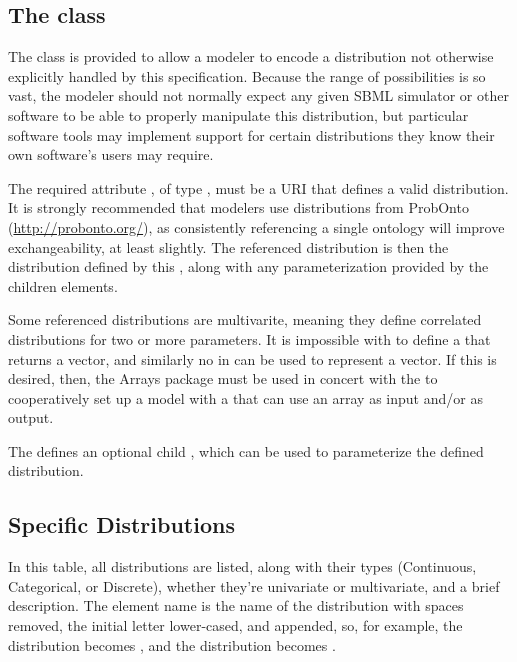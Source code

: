 \subsection{The  class}
\label{ExternalDistribution-class}
\label{externaldistribution-class}

The \ExternalDistribution class is provided to allow a modeler to encode a distribution not otherwise explicitly handled by this specification.  Because the range of possibilities is so vast, the modeler should not normally expect any given SBML simulator or other software to be able to properly manipulate this distribution, but particular software tools may implement support for certain distributions they know their own software's users may require.

The required attribute , of type , must be a URI that defines a valid distribution.  It is strongly recommended that modelers use distributions from ProbOnto (\url{http://probonto.org/}), as consistently referencing a single ontology will improve exchangeability, at least slightly.  The referenced distribution is then the distribution defined by this \ExternalDistribution, along with any parameterization provided by the children \ExternalParameter elements.

Some referenced distributions are multivarite, meaning they define correlated distributions for two or more parameters.  It is impossible with \sbmlthreecore to define a \FunctionDefinition that returns a vector, and similarly no  in \sbmlthreecore can be used to represent a vector.  If this is desired, then, the Arrays package must be used in concert with the \ExternalDistribution to cooperatively set up a model with a \FunctionDefinition that can use an array as input and/or as output.

The \ExternalDistribution defines an optional child \ListOfExternalParameters, which can be used to parameterize the defined distribution.


\subsection{Specific Distributions}
\label{sec:allDistributions}

In this table, all distributions are listed, along with their types (Continuous, Categorical, or Discrete), whether they're univariate or multivariate, and a brief description.  The element name is the name of the distribution with spaces removed, the initial letter lower-cased, and  appended, so, for example, the  distribution becomes , and the  distribution becomes .


